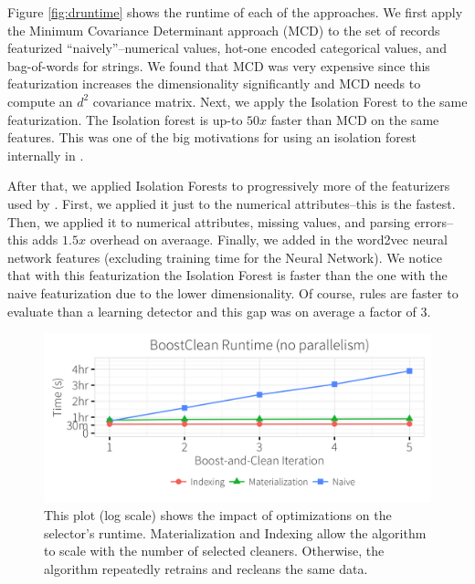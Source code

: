  Figure  \ref{fig:druntime} shows the runtime of each of the approaches.
 We first apply the Minimum Covariance Determinant approach (MCD) to the set of records featurized ``naively''--numerical values, hot-one encoded categorical values, and bag-of-words for strings.
 We found that MCD was very expensive since this featurization increases the dimensionality significantly and MCD needs to compute an $d^2$ covariance matrix.
 Next, we apply the Isolation Forest to the same featurization.
 The Isolation forest is up-to $50x$ faster than MCD on the same features.
 This was one of the big motivations for using an isolation forest internally in \sys.
 
 After that, we applied Isolation Forests to progressively more of the featurizers used by \sys.
 First, we applied it just to the numerical attributes--this is the fastest.
 Then, we applied it to numerical attributes, missing values, and parsing errors--this adds $1.5x$ overhead on averaage.
 Finally, we added in the word2vec neural network features (excluding training time for the Neural Network).
 We notice that with this featurization the Isolation Forest is faster than the one with the naive featurization due to the lower dimensionality.
 Of course, rules are faster to evaluate than a learning detector and this gap was on average a factor of 3.
 
 \begin{figure}[t]
\centering
 \includegraphics[width=0.9\columnwidth]{exp/opt1.png}
 \caption{This plot (log scale) shows the impact of optimizations on the selector's runtime. Materialization and Indexing allow the algorithm to scale with the number of selected cleaners. Otherwise, the algorithm repeatedly retrains and recleans the same data.
 \label{fig:opt}}
\end{figure}
 
